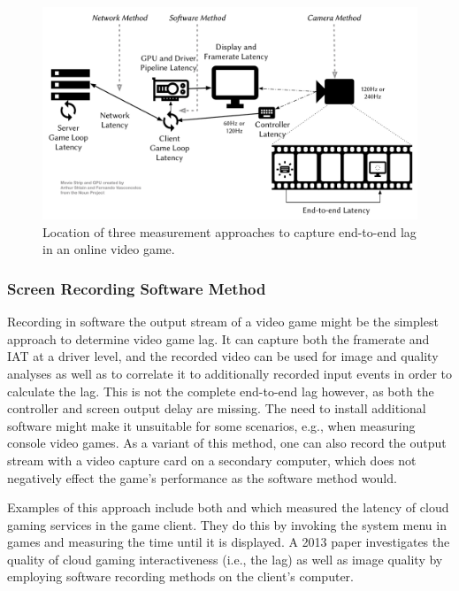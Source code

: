 \begin{figure}[!t]
    \centering
    \includegraphics[width=1.0\columnwidth]{../../models/e2e-lag.pdf}
    \caption{Location of three measurement approaches to capture end-to-end lag in an online video game.}
\label{fig:measurement-methods}
\end{figure}


\subsubsection{Screen Recording Software Method}
Recording in software the output stream of a video game might be the simplest approach to determine video game lag. It can capture both the framerate and \gls{IAT} at a driver level, and the recorded video can be used for image and quality analyses as well as to correlate it to additionally recorded input events in order to calculate the lag. This is not the complete end-to-end lag however, as both the controller and screen output delay are missing. The need to install additional software might make it unsuitable for some scenarios, e.g., when measuring console video games. As a variant of this method, one can also record the output stream with a video capture card on a secondary computer, which does not negatively effect the game's performance as the software method would.

Examples of this approach include both \cite{Chen:2011:MLC:2072298.2071991} and \cite{6670099} which measured the latency of cloud gaming services in the game client. They do this by invoking the system menu in games and measuring the time until it is displayed. A 2013 paper \cite{6574660} investigates the quality of cloud gaming interactiveness (i.e., the lag) as well as image quality by employing software recording methods on the client's computer.


